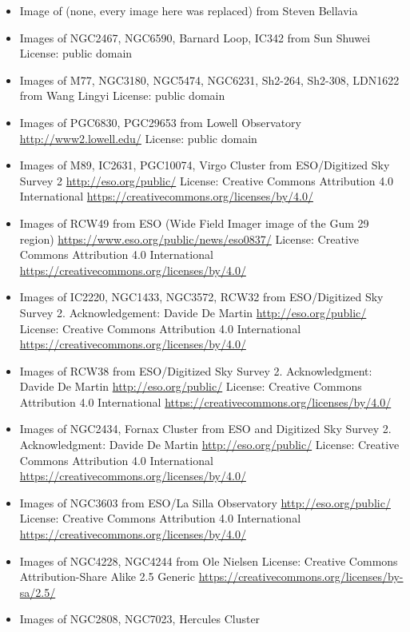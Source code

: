 \begin{itemize}
	 from NASA, ESA, the Hubble Heritage (STScI/AURA)-ESA/Hubble
	 Collaboration
	 License: public domain; \url{http://hubblesite.org/copyright/}
\item Image of (none, every image here was replaced) from Steven Bellavia
\item Images of NGC2467, NGC6590, Barnard Loop, IC342
	 from Sun Shuwei
	 License: public domain
\item Images of M77, NGC3180, NGC5474, NGC6231, Sh2-264, Sh2-308, LDN1622
	 from Wang Lingyi
	 License: public domain
\item Images of PGC6830, PGC29653 from Lowell Observatory
	 \url{http://www2.lowell.edu/}
	 License: public domain
\item Images of M89, IC2631, PGC10074, Virgo Cluster
	 from ESO/Digitized Sky Survey 2
	 \url{http://eso.org/public/}
	 License: Creative Commons Attribution 4.0 International \url{https://creativecommons.org/licenses/by/4.0/}
\item Images of RCW49
	 from ESO (Wide Field Imager image of the Gum 29 region)
	 \url{https://www.eso.org/public/news/eso0837/}
	 License: Creative Commons Attribution 4.0 International \url{https://creativecommons.org/licenses/by/4.0/}
\item Images of IC2220, NGC1433, NGC3572, RCW32
	 from ESO/Digitized Sky Survey 2. Acknowledgement: Davide De Martin
	 \url{http://eso.org/public/}
	 License: Creative Commons Attribution 4.0 International \url{https://creativecommons.org/licenses/by/4.0/}
\item Images of RCW38
	 from ESO/Digitized Sky Survey 2. Acknowledgment: Davide De Martin
	 \url{http://eso.org/public/}
	 License: Creative Commons Attribution 4.0 International \url{https://creativecommons.org/licenses/by/4.0/}
\item Images of NGC2434, Fornax Cluster
	 from ESO and Digitized Sky Survey 2. Acknowledgment: Davide De Martin
	 \url{http://eso.org/public/}
	 License: Creative Commons Attribution 4.0 International \url{https://creativecommons.org/licenses/by/4.0/}
\item Images of NGC3603 
from ESO/La Silla Observatory
	 \url{http://eso.org/public/}
	 License: Creative Commons Attribution 4.0 International \url{https://creativecommons.org/licenses/by/4.0/} 
\item Images of NGC4228, NGC4244
	 from Ole Nielsen
	 License: Creative Commons Attribution-Share Alike 2.5 Generic \url{https://creativecommons.org/licenses/by-sa/2.5/} 
\item Images of NGC2808, NGC7023, Hercules Cluster 

\end{itemize}
